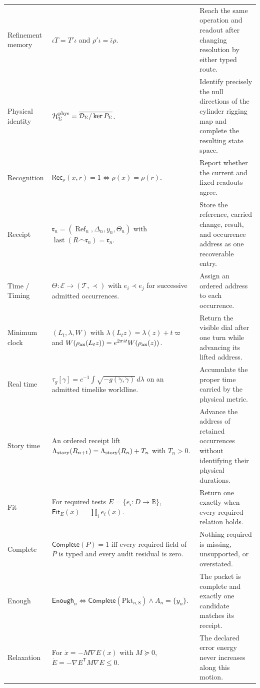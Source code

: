 \documentclass[10pt]{article}
\begin{document}
\begin{longtable}{@{}p{}p{}p{}@{}}
Refinement memory & $\iota T=T'\iota$ and $\rho'\iota=\bar\iota\rho$. & Reach the same operation and readout after changing resolution by either typed route.\\
Physical identity & $\mathcal H_\Sigma^{\rm phys}=\overline{\mathcal D_\Sigma/\ker P_\Sigma}$. & Identify precisely the null directions of the cylinder rigging map and complete the resulting state space.\\
Recognition & $\mathsf{Rec}_{\rho}(x,r)=1\iff\rho(x)=\rho(r)$. & Report whether the current and fixed readouts agree.\\
Receipt & $\mathfrak r_n=(\operatorname{Ref}_n,\Delta_n,y_n,\Theta_n)$ with $\operatorname{last}(R\frown\mathfrak r_n)=\mathfrak r_n$. & Store the reference, carried change, result, and occurrence address as one recoverable entry.\\
Time / Timing & $\Theta:\mathcal E\to(\mathcal T,\prec)$ with $e_i\prec e_j$ for successive admitted occurrences. & Assign an ordered address to each occurrence.\\
Minimum clock & $(L_t,\lambda,W)$ with $\lambda(L_tz)=\lambda(z)+t\varpi$ and $W(\rho_{\rm ax}(L_tz))=e^{2\pi it}W(\rho_{\rm ax}(z))$. & Return the visible dial after one turn while advancing its lifted address.\\
Real time & $\tau_g[\gamma]=c^{-1}\int\sqrt{-g(\dot\gamma,\dot\gamma)}\,d\lambda$ on an admitted timelike worldline. & Accumulate the proper time carried by the physical metric.\\
Story time & An ordered receipt lift $\Lambda_{\rm story}(R_{n+1})=\Lambda_{\rm story}(R_n)+T_n$ with $T_n>0$. & Advance the address of retained occurrences without identifying their physical durations.\\
Fit & For required tests $E=\{e_i:D\to\mathbb B\}$, $\mathsf{Fit}_E(x)=\prod_i e_i(x)$. & Return one exactly when every required relation holds.\\
Complete & $\mathsf{Complete}(P)=1$ iff every required field of $P$ is typed and every audit residual is zero. & Nothing required is missing, unsupported, or overstated.\\
Enough & $\mathsf{Enough}_n\iff\mathsf{Complete}(\mathrm{Pkt}_{n,8})\land A_n=\{y_n\}$. & The packet is complete and exactly one candidate matches its receipt.\\
Relaxation & For $\dot x=-M\nabla E(x)$ with $M\succeq0$, $\dot E=-\nabla E^{\mathsf T}M\nabla E\le0$. & The declared error energy never increases along this motion.\\

\end{longtable}
\end{document}
